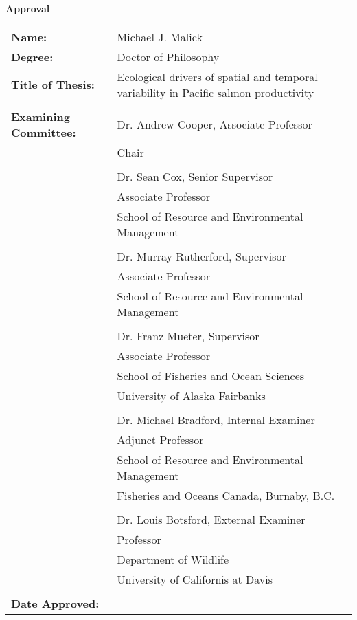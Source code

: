 


\begin{center}
{ \Large \textbf{Approval} }
\end{center}

\vspace{4mm}

\hspace*{-1cm} \begin{tabular}{ l p{94mm} }
  \textbf{Name:} & Michael J. Malick \\
  \textbf{Degree:} & Doctor of Philosophy \\
  \textbf{Title of Thesis:} & Ecological drivers of spatial and temporal
  variability in Pacific salmon productivity \\

  & \\

  \textbf{Examining Committee:} & Dr. Andrew Cooper, Associate Professor \\
                                & Chair \\

    & \\ \cline{2-2}
    & Dr. Sean Cox, Senior Supervisor \\
    & Associate Professor \\
    & School of Resource and Environmental Management \\

    & \\ \cline{2-2}
    & Dr. Murray Rutherford, Supervisor \\
    & Associate Professor \\
    & School of Resource and Environmental Management \\

    & \\ \cline{2-2}
    & Dr. Franz Mueter, Supervisor \\
    & Associate Professor \\
    & School of Fisheries and Ocean Sciences\\
    & University of Alaska Fairbanks\\

    & \\ \cline{2-2}
    & Dr. Michael Bradford, Internal Examiner \\
    & Adjunct Professor \\
    & School of Resource and Environmental Management \\
    & Fisheries and Oceans Canada, Burnaby, B.C. \\

    & \\ \cline{2-2}
    & Dr. Louis Botsford, External Examiner \\
    & Professor \\
    & Department of Wildlife \\
    & University of Californis at Davis \\
    
    & \\
  \textbf{Date Approved:}  & \\  \cline{2-2}
\end{tabular}


